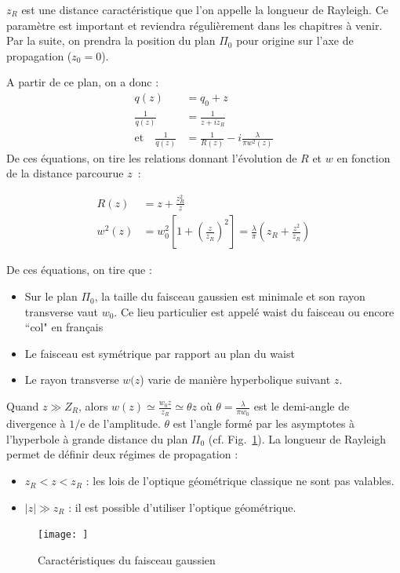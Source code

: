 \documentclass[a4paper]{book}
\begin{document}
$z_R$ est une distance caractéristique que l'on appelle la longueur de Rayleigh. Ce paramètre est important et reviendra régulièrement dans les chapitres à venir.
Par la suite, on prendra la position du plan $\Pi_0$ pour origine sur l'axe de propagation ($z_0=0$).

A partir de ce plan, on a donc :
\begin{align}
    q(z) &= q_0+z\\
    \frac{1}{q(z)}&=\frac{1}{z+iz_R}\\
    \textrm{et} \quad \frac{1}{q(z)}&=\frac{1}{R(z)}-i\frac{\lambda}{\pi w^2(z)}
\end{align}
De ces équations, on tire les relations donnant l'évolution de $R$ et $w$ en fonction de la distance parcourue $z$~:

\begin{align}
  R(z) &= z + \frac{z_R^2}{z}\\
  w^2(z)&= w_0^2\left[1+\left(\frac{z}{z_R}\right)^2\right]  = \frac{\lambda}{\pi}\left(z_R+\frac{z^2}{z_R}\right)
\end{align}

De ces équations, on tire que :
\begin{itemize}
    \item Sur le plan $\Pi_0$, la taille du faisceau gaussien est minimale et son rayon transverse vaut $w_0$. Ce lieu particulier est appelé waist du faisceau ou encore  ``col" en français
    \item Le faisceau est symétrique par rapport au plan du waist
    \item Le rayon transverse $w(z$) varie de manière hyperbolique suivant $z$.
\end{itemize}

Quand $z\gg Z_R$, alors $w(z)\simeq\frac{w_0z}{z_R}\simeq \theta z$ où $\theta = \frac{\lambda}{\pi w_0}$ est le demi-angle de divergence à $1/$e de
l'amplitude. $\theta$ est l'angle formé par les asymptotes à l'hyperbole à grande
distance du plan $\Pi_0$ (cf. Fig.~\ref{fig:carac_gauss}).
La longueur de Rayleigh permet de définir deux régimes de propagation :
\begin{itemize}
    \item $z_R < z < z_R$ : les lois de l'optique géométrique classique ne sont pas valables.
    \item $|z|\gg z_R$ : il est possible d'utiliser l'optique géométrique.
\end{itemize}


\begin{figure}[!htbp]
\begin{center}
\texttt{[image: ]}
\end{center}
\caption{Caractéristiques du faisceau gaussien}
\label{fig:carac_gauss}
\end{figure}
\end{document}
